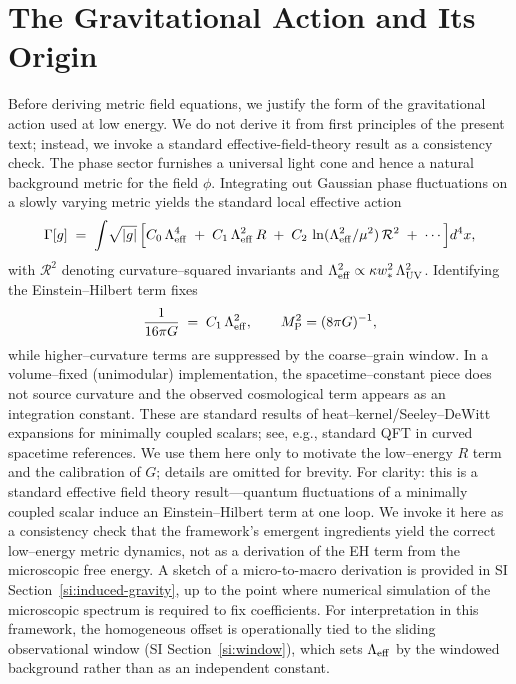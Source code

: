 \documentclass[11pt]{article}
\begin{document}
\section{The Gravitational Action and Its Origin}\label{sec:metric-action}
Before deriving metric field equations, we justify the form of the gravitational action used at low energy. We do not derive it from first principles of the present text; instead, we invoke a standard effective-field-theory result as a consistency check. The phase sector furnishes a universal light cone and hence a natural background metric for the field $\phi$. Integrating out Gaussian phase fluctuations on a slowly varying metric yields the standard local effective action
\begin{equation}
  \Gamma[g] \;=\; \int \!\sqrt{|g|}\,\Big[ C_0\,\Lambda_{\rm eff}^4 \;+\; C_1\,\Lambda_{\rm eff}^2\,R \;+\; C_2\,\ln(\Lambda_{\rm eff}^2/\mu^2)\,\mathcal R^2 \;+\; \cdots \Big] d^4x,
\end{equation}
with $\mathcal R^2$ denoting curvature--squared invariants and $\Lambda_{\rm eff}^2\propto \kappa w_*^2\,\Lambda_{\rm UV}^2$. Identifying the Einstein--Hilbert term fixes
\begin{equation}
  \frac{1}{16\pi G} \;=\; C_1\,\Lambda_{\rm eff}^2,\qquad M_{\rm P}^2=(8\pi G)^{-1},
\end{equation}
while higher--curvature terms are suppressed by the coarse--grain window. In a volume--fixed (unimodular) implementation, the spacetime--constant piece does not source curvature and the observed cosmological term appears as an integration constant. These are standard results of heat--kernel/Seeley--DeWitt expansions for minimally coupled scalars; see, e.g., standard QFT in curved spacetime references. We use them here only to motivate the low--energy $R$ term and the calibration of $G$; details are omitted for brevity.
For clarity: this is a standard effective field theory result—quantum fluctuations of a minimally coupled scalar induce an Einstein–Hilbert term at one loop. We invoke it here as a consistency check that the framework's emergent ingredients yield the correct low–energy metric dynamics, not as a derivation of the EH term from the microscopic free energy. A sketch of a micro-to-macro derivation is provided in SI Section~\ref{si:induced-gravity}, up to the point where numerical simulation of the microscopic spectrum is required to fix coefficients.
For interpretation in this framework, the homogeneous offset is operationally tied to the sliding observational window (SI Section~\ref{si:window}), which sets $\Lambda_{\rm eff}$ by the windowed background rather than as an independent constant.
\end{document}
